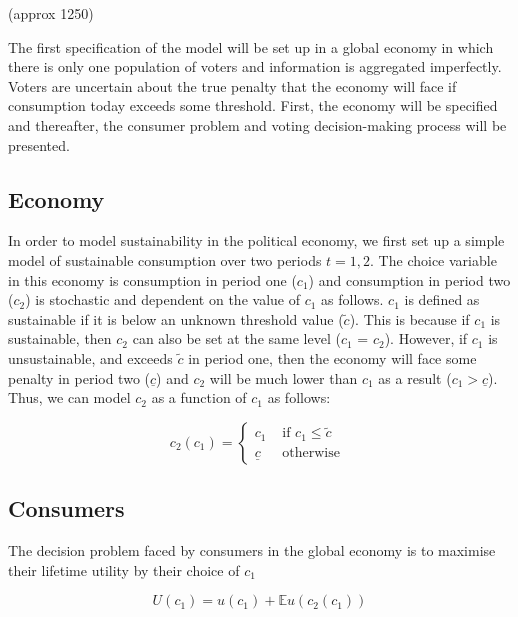 \documentclass[11pt,preprint, authoryear]{elsarticle}
\numberwithin{equation}{section}
\numberwithin{figure}{section}
\numberwithin{table}{section}
\begin{document}
(approx 1250)

The first specification of the model will be set up in a global economy
in which there is only one population of voters and information is
aggregated imperfectly. Voters are uncertain about the true penalty that
the economy will face if consumption today exceeds some threshold.
First, the economy will be specified and thereafter, the consumer
problem and voting decision-making process will be presented.

\hypertarget{economy}{%
\subsection*{Economy}\label{economy}}

In order to model sustainability in the political economy, we first set
up a simple model of sustainable consumption over two periods
\(t = 1, 2\). The choice variable in this economy is consumption in
period one (\(c_1\)) and consumption in period two (\(c_2\)) is
stochastic and dependent on the value of \(c_1\) as follows. \(c_1\) is
defined as sustainable if it is below an unknown threshold value
(\(\tilde{c}\)). This is because if \(c_1\) is sustainable, then \(c_2\)
can also be set at the same level (\(c_1\) = \(c_2\)). However, if
\(c_1\) is unsustainable, and exceeds \(\tilde{c}\) in period one, then
the economy will face some penalty in period two (\(\underline{c}\)) and
\(c_2\) will be much lower than \(c_1\) as a result
(\(c_1> \underline{c}\)). Thus, we can model \(c_2\) as a function of
\(c_1\) as follows:

\[
c_2\left(c_1\right)= \begin{cases}c_1 & \text { if } c_1 \leq \tilde{c} \\ \underline{c} & \text { otherwise }\end{cases}
\]

\hypertarget{consumers}{%
\subsection*{Consumers}\label{consumers}}

The decision problem faced by consumers in the global economy is to
maximise their lifetime utility by their choice of \(c_1\)

\[
U\left(c_1\right)=u\left(c_1\right)+\mathbb{E} u\left(c_2\left(c_1\right)\right)
\]
\end{document}
